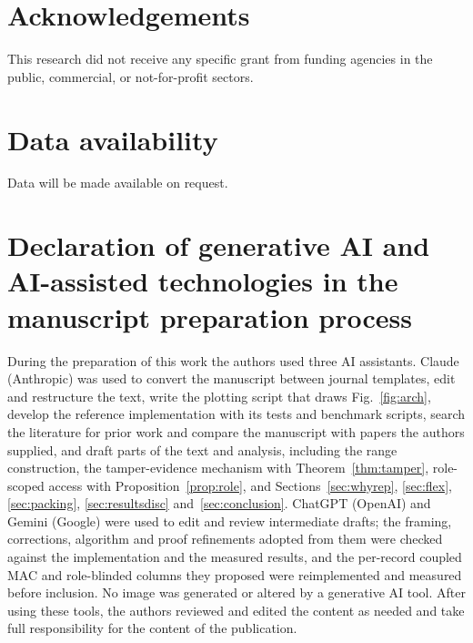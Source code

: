 \documentclass[a4paper,fleqn]{cas-sc}
\begin{document}
\section*{Acknowledgements}
This research did not receive any specific grant from funding agencies in the
public, commercial, or not-for-profit sectors.

\section*{Data availability}
Data will be made available on request.

\section*{Declaration of generative AI and AI-assisted technologies in the
manuscript preparation process}
During the preparation of this work the authors used three AI assistants.
Claude (Anthropic) was used to convert the manuscript between journal
templates, edit and restructure the text, write the plotting script that draws
Fig.~\ref{fig:arch}, develop the reference implementation with its tests and
benchmark scripts, search the literature for prior work and compare the
manuscript with papers the authors supplied, and draft parts of
the text and analysis, including the range construction, the tamper-evidence
mechanism with Theorem~\ref{thm:tamper}, role-scoped access with
Proposition~\ref{prop:role}, and Sections~\ref{sec:whyrep}, \ref{sec:flex},
\ref{sec:packing}, \ref{sec:resultsdisc} and~\ref{sec:conclusion}. ChatGPT
(OpenAI) and Gemini (Google) were used to edit and review intermediate drafts;
the framing, corrections, algorithm and proof refinements adopted from them
were checked against the implementation and the measured results, and the
per-record coupled MAC and role-blinded columns they proposed were
reimplemented and measured before inclusion. No image was generated or altered
by a generative AI tool. After using these tools, the authors reviewed and
edited the content as needed and take full responsibility for the content of
the publication.



\end{document}
